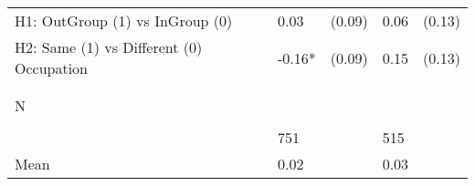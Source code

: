 \begin{tabular}{l*{4}{l}}
H1: OutGroup (1) vs InGroup (0)&     0.03   &   (0.09)&     0.06   &   (0.13)\\
 
H2: Same (1) vs Different (0) Occupation&    -0.16*  &   (0.09)&     0.15   &   (0.13)\\
 
  \\\\[-0.5cm] N \\\\[-0.6cm]&      751   &         &      515   &         \\
Mean            &     0.02&         &     0.03&         \\
 
\bottomrule  \end{tabular}  
